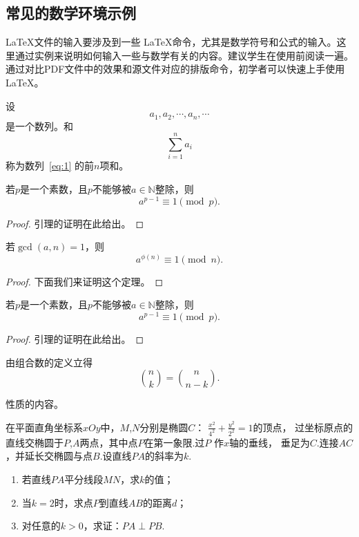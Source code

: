 \subsection{常见的数学环境示例}
\LaTeX 文件的输入要涉及到一些 \LaTeX 命令，尤其是数学符号和公式的输入。这里通过实例来说明如何输入一些与数学有关的内容。建议学生在使用前阅读一遍。通过对比PDF文件中的效果和源文件对应的排版命令，初学者可以快速上手使用\LaTeX 。
\begin{definition}
设
\begin{equation}\label{eq:1}
    a_1,a_2,\cdots, a_n, \cdots
\end{equation}
是一个数列。和
$$\sum_{i=1}^n a_i$$
称为数列~\eqref{eq:1} 的前$n$项和。
\end{definition}
\begin{lemma}[新定理]
若$p$是一个素数，且$p$不能够被$a\in \mathbb{N}$整除，则
$$a^{p-1}\equiv 1\pmod{p}.$$
\end{lemma}
\begin{proof}
引理的证明在此给出。
\end{proof}
\begin{theorem}\label{thm:euola}
若$\gcd(a,n) = 1$，则
$$a^{\phi(n)}\equiv 1\pmod{n}.$$
\end{theorem}
\begin{proof}
下面我们来证明这个定理。
\end{proof}
\begin{lemma}
若$p$是一个素数，且$p$不能够被$a\in \mathbb{N}$整除，则
$$a^{p-1}\equiv 1\pmod{p}.$$
\end{lemma}
\begin{proof}
引理的证明在此给出。
\end{proof}
\begin{corollary} 由组合数的定义立得
$$\binom{n}{k}=\binom{n}{n-k}.$$
\end{corollary}
\begin{property}
性质的内容。
\end{property}
\begin{example}[2011\ 江苏卷]在平面直角坐标系$xOy$中，$M$,$N$分别是椭圆$C$：
$\frac{x^{2}}{4^{2}}+\frac{y^{2}}{2^{2}}=1$的顶点，
过坐标原点的直线交椭圆于$P$,$A$两点，其中点$P$在第一象限.过$P$ 作$x$轴的垂线，
垂足为$C$.连接$AC$，并延长交椭圆与点$B$.设直线$PA$的斜率为$k$.\\
\parbox{10cm}{
\begin{enumerate}
  \item 若直线$PA$平分线段$MN$，求$k$的值；
  \item 当$k=2$时，求点$P$到直线$AB$的距离$d$；
  \item 对任意的$k>0$，求证：$PA\perp PB$.
\end{enumerate}}
\end{example}

